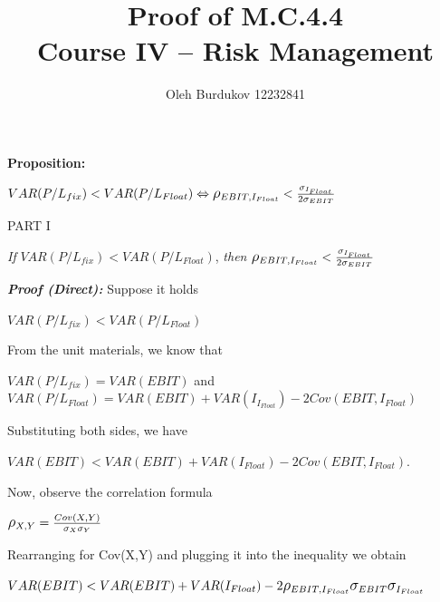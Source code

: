 \documentclass[12pt, a4paper]{article}
\begin{document}
\title{Proof of M.C.4.4\\[0.5em] \large Course IV -- Risk Management}
\author{Oleh Burdukov 12232841}
\maketitle
\textbf{Proposition:}

\begin{center}
$VAR(P/L_{fix}) < VAR(P/L_{Float}) \Leftrightarrow \mathlarger{\mathlarger{\rho}}_{EBIT,I_{Float}} < \frac{\sigma_{I_{Float}}}{2\sigma_{EBIT}}$
\end{center}

\bigskip

\begin{center}
PART I
\end{center}

\begin{center}
\textit{If} $VAR(P/L_{fix}) < VAR(P/L_{Float})$, \textit{then} $\mathlarger{\mathlarger{\rho}}_{EBIT,I_{Float}} < \frac{\sigma_{I_{Float}}}{2\sigma_{EBIT}}$
\end{center}
\bigskip

\textbf{\textit{Proof (Direct):}} Suppose it holds

\begin{center}
$VAR(P/L_{fix}) < VAR(P/L_{Float})$
\end{center}

From the unit materials, we know that

\begin{center}
$VAR(P/L_{fix}) = VAR(EBIT)$ and
$VAR(P/L_{Float}) = VAR(EBIT) + VAR(I_{I_{Float}}) - 2Cov(EBIT,I_{Float})$
\end{center}

Substituting both sides, we have

\begin{center}
$VAR(EBIT) < VAR(EBIT) + VAR(I_{Float}) - 2Cov(EBIT,I_{Float})$.
\end{center}

Now, observe the correlation formula

\begin{center}
$\mathlarger{\mathlarger{\rho}}_{X,Y} = \frac{Cov(X,Y)}{\sigma_{X}\sigma_{Y}}$
\end{center}

Rearranging for Cov(X,Y) and plugging it into the inequality we obtain

\begin{center}
$VAR(EBIT) < VAR(EBIT) + VAR(I_{Float}) - 2\mathlarger{\mathlarger{\rho}}_{EBIT, I_{Float}} \mathlarger{\mathlarger{\sigma}}_{EBIT} \mathlarger{\mathlarger{\sigma}}_{I_{Float}}$
\end{center}
\end{document}
